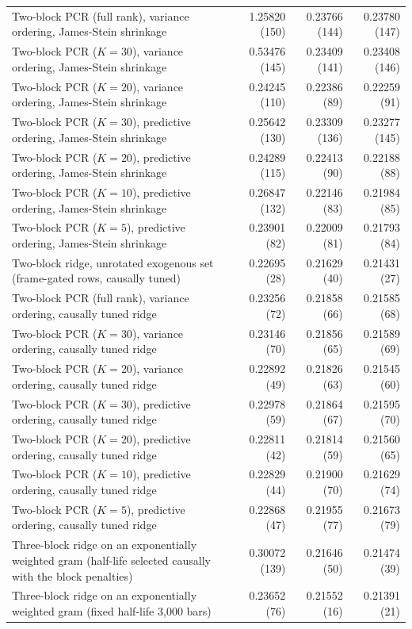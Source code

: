 \begin{longtable}{p{}rrr}
Two-block PCR (full rank), variance ordering, James-Stein shrinkage & 1.25820 (150) & 0.23766 (144) & 0.23780 (147) \\
Two-block PCR ($K=30$), variance ordering, James-Stein shrinkage & 0.53476 (145) & 0.23409 (141) & 0.23408 (146) \\
Two-block PCR ($K=20$), variance ordering, James-Stein shrinkage & 0.24245 (110) & 0.22386 (89) & 0.22259 (91) \\
Two-block PCR ($K=30$), predictive ordering, James-Stein shrinkage & 0.25642 (130) & 0.23309 (136) & 0.23277 (145) \\
Two-block PCR ($K=20$), predictive ordering, James-Stein shrinkage & 0.24289 (115) & 0.22413 (90) & 0.22188 (88) \\
Two-block PCR ($K=10$), predictive ordering, James-Stein shrinkage & 0.26847 (132) & 0.22146 (83) & 0.21984 (85) \\
Two-block PCR ($K=5$), predictive ordering, James-Stein shrinkage & 0.23901 (82) & 0.22009 (81) & 0.21793 (84) \\
Two-block ridge, unrotated exogenous set (frame-gated rows, causally tuned) & 0.22695 (28) & 0.21629 (40) & 0.21431 (27) \\
Two-block PCR (full rank), variance ordering, causally tuned ridge & 0.23256 (72) & 0.21858 (66) & 0.21585 (68) \\
Two-block PCR ($K=30$), variance ordering, causally tuned ridge & 0.23146 (70) & 0.21856 (65) & 0.21589 (69) \\
Two-block PCR ($K=20$), variance ordering, causally tuned ridge & 0.22892 (49) & 0.21826 (63) & 0.21545 (60) \\
Two-block PCR ($K=30$), predictive ordering, causally tuned ridge & 0.22978 (59) & 0.21864 (67) & 0.21595 (70) \\
Two-block PCR ($K=20$), predictive ordering, causally tuned ridge & 0.22811 (42) & 0.21814 (59) & 0.21560 (65) \\
Two-block PCR ($K=10$), predictive ordering, causally tuned ridge & 0.22829 (44) & 0.21900 (70) & 0.21629 (74) \\
Two-block PCR ($K=5$), predictive ordering, causally tuned ridge & 0.22868 (47) & 0.21955 (77) & 0.21673 (79) \\
Three-block ridge on an exponentially weighted gram (half-life selected causally with the block penalties) & 0.30072 (139) & 0.21646 (50) & 0.21474 (39) \\
Three-block ridge on an exponentially weighted gram (fixed half-life 3{,}000 bars) & 0.23652 (76) & 0.21552 (16) & 0.21391 (21) \\

\end{longtable}
